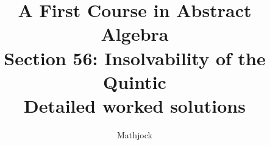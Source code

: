 
\title{\textbf{A First Course in Abstract Algebra}\\[0.3em]Section 56: Insolvability of the Quintic\\[0.3em]\large Detailed worked solutions}
\author{Mathjock}
\date{}

\maketitle
\bookinfo
\tableofcontents
\clearpage
\renewcommand{\thesection}{56}
\renewcommand{\theHsection}{fraleigh.56}


